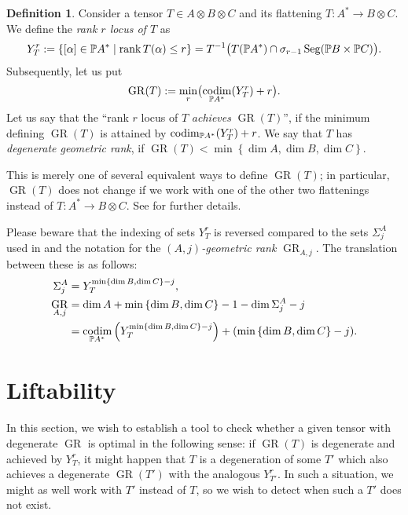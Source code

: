 \documentclass[a4paper,10pt]{article}
\def\zav#1{\left(#1\right)}
\def\set#1{\left\{#1\right\}}
\DeclareMathOperator{\rank}{rank}\let\rk\rank
\DeclareMathOperator{\codim}{codim}
\DeclareMathOperator{\Seg}{Seg}
\DeclareMathOperator{\GR}{GR}
\def\uv#1{``#1''}
\theoremstyle{definition}
\newtheorem{definition}[theorem]{Definition}
\theoremstyle{remark}
\begin{document}
\begin{definition}
Consider a tensor $T\in A\otimes B\otimes C$ and its flattening $T:A^*\to B\otimes C$. We define the \emph{rank $r$ locus of $T$} as
\[
    Y^r_T := \set{[\alpha]\in\pe A^* \mid \rank T(\alpha)\leq r} = T^{-1}\bigl(T(\pe A^*)\cap \sigma_{r-1}\Seg(\pe B\times\pe C)\bigr).
\]
Subsequently, let us put
\[
    \GR(T) := \min_{r}\bigl(\codim_{\pe A^*}(Y^r_T)+r\bigr).
\]
Let us say that the \uv{rank $r$ locus of $T$ \emph{achieves} $\GR(T)$}, if the minimum defining $\GR(T)$ is attained by $\codim_{\pe A^*}(Y^r_T)+r$. We say that $T$ has \emph{degenerate geometric rank}, if $\GR(T)<\min\set{\dim A,\dim B,\dim C}$.
\end{definition}
This is merely one of several equivalent ways to define $\GR(T)$; in particular, $\GR(T)$ does not change if we work with one of the other two flattenings instead of $T:A^*\to B\otimes C$. See \cite[Sections 2 and 3]{kopparty-moshkovitz-zuiddam} for further details.

Please beware that the indexing of sets $Y^r_T$ is reversed compared to the sets $\Sigma^A_j$ used in \cite{geng-landsberg} and the notation for the \emph{$(A,j)$-geometric rank} $\GR_{A,j}$. The translation between these is as follows:
\begin{align*}
    \Sigma^A_j &= Y^{\min\set{\dim B,\dim C}-j}_T,\\
    \GR_{A,j} &= \dim A+\min\set{\dim B,\dim C}-1-\dim\Sigma^A_j-j \\&= \codim_{\pe A^*}\zav{Y^{\min\set{\dim B,\dim C}-j}_T}+(\min\set{\dim B,\dim C}-j).
\end{align*}

















\section{Liftability}

In this section, we wish to establish a tool to check whether a given tensor with degenerate $\GR$ is optimal in the following sense: if $\GR(T)$ is degenerate and achieved by $Y^r_T$, it might happen that $T$ is a degeneration of some $T'$ which also achieves a degenerate $\GR(T')$ with the analogous $Y^r_{T'}$. In such a situation, we might as well work with $T'$ instead of $T$, so we wish to detect when such a $T'$ does not exist.
\end{document}
